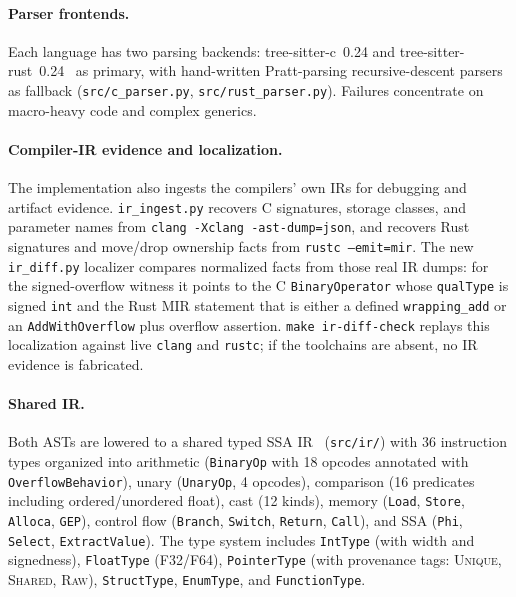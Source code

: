 \documentclass[10pt,a4paper]{article}
\begin{document}
\paragraph{Parser frontends.}
Each language has two parsing backends: tree-sitter-c~0.24 and
tree-sitter-rust~0.24~\cite{treesitter2024} as primary, with
hand-written Pratt-parsing recursive-descent
parsers~\cite{pratt1973top} as fallback (\texttt{src/c\_parser.py},
\texttt{src/rust\_parser.py}).  Failures concentrate on macro-heavy code and complex generics.

\paragraph{Compiler-IR evidence and localization.}
The implementation also ingests the compilers' own IRs for debugging and
artifact evidence.  \texttt{ir\_ingest.py} recovers C signatures, storage
classes, and parameter names from \texttt{clang -Xclang -ast-dump=json}, and
recovers Rust signatures and move/drop ownership facts from \texttt{rustc
--emit=mir}.  The new \texttt{ir\_diff.py} localizer compares normalized facts
from those real IR dumps: for the signed-overflow witness it points to the C
\texttt{BinaryOperator} whose \texttt{qualType} is signed \texttt{int} and the
Rust MIR statement that is either a defined \texttt{wrapping\_add} or an
\texttt{AddWithOverflow} plus overflow assertion.  \texttt{make ir-diff-check}
replays this localization against live \texttt{clang} and \texttt{rustc}; if the
toolchains are absent, no IR evidence is fabricated.

\paragraph{Shared IR.}
Both ASTs are lowered to a shared typed SSA IR~\cite{cytron1991ssa}
(\texttt{src/ir/}) with 36 instruction types organized into
arithmetic (\texttt{BinaryOp} with 18 opcodes annotated with
\texttt{OverflowBehavior}), unary (\texttt{UnaryOp}, 4 opcodes),
comparison (16 predicates including ordered/unordered float),
cast (12 kinds), memory (\texttt{Load}, \texttt{Store},
\texttt{Alloca}, \texttt{GEP}), control flow (\texttt{Branch},
\texttt{Switch}, \texttt{Return}, \texttt{Call}), and SSA
(\texttt{Phi}, \texttt{Select}, \texttt{ExtractValue}).
The type system includes \texttt{IntType} (with width and signedness),
\texttt{FloatType} (F32/F64), \texttt{PointerType} (with provenance
tags: \textsc{Unique}, \textsc{Shared}, \textsc{Raw}),
\texttt{StructType}, \texttt{EnumType}, and \texttt{FunctionType}.
\end{document}
